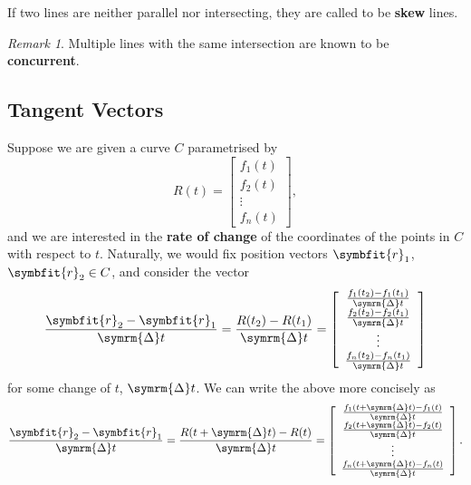 \documentclass[math]{amznotes}
\theoremstyle{remark}
\newtheorem*{remark}{Remark}
\begin{document}
If two lines are neither parallel nor intersecting, they are called to be {\color{red} \textbf{skew}} lines.
\begin{notebox}
    \begin{remark}
        Multiple lines with the same intersection are known to be {\color{red} \textbf{concurrent}}.
    \end{remark}
\end{notebox}
\subsection{Tangent Vectors}
Suppose we are given a curve $C$ parametrised by
\begin{equation*}
    R(t) = \left[\begin{array}{c}
            f_1(t) \\
            f_2(t) \\
            \vdots \\
            f_n(t)
        \end{array}\right],
\end{equation*}
and we are interested in the {\color{red} \textbf{rate of change}} of the coordinates of the points in $C$ with respect to $t$. Naturally, we would fix position vectors $\symbfit{r}_1$, $\symbfit{r}_2 \in C$, and consider the vector
\begin{equation*}
    \frac{\symbfit{r}_2 - \symbfit{r}_1}{\symrm{\Delta} t} = \frac{R(t_2) - R(t_1)}{\symrm{\Delta} t} = \left[\begin{array}{c}
            \frac{f_1(t_2) - f_1(t_1)}{\symrm{\Delta} t} \\
            \frac{f_2(t_2) - f_2(t_1)}{\symrm{\Delta} t} \\
            \vdots                                       \\
            \frac{f_n(t_2) - f_n(t_1)}{\symrm{\Delta} t}
        \end{array}\right]
\end{equation*}
for some change of $t$, $\symrm{\Delta} t$. We can write the above more concisely as
\begin{equation*}
    \frac{\symbfit{r}_2 - \symbfit{r}_1}{\symrm{\Delta} t} = \frac{R(t + \symrm{\Delta} t) - R(t)}{\symrm{\Delta} t} = \left[\begin{array}{c}
            \frac{f_1(t + \symrm{\Delta} t) - f_1(t)}{\symrm{\Delta} t} \\
            \frac{f_2(t + \symrm{\Delta} t) - f_2(t)}{\symrm{\Delta} t} \\
            \vdots                                                      \\
            \frac{f_n(t + \symrm{\Delta} t) - f_n(t)}{\symrm{\Delta} t}
        \end{array}\right].
\end{equation*}
\end{document}
